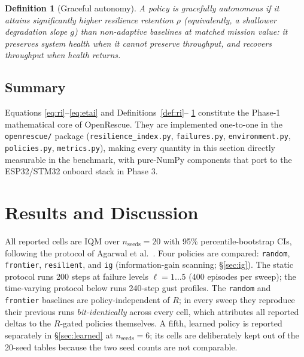 \documentclass[12pt,a4paper]{article}
\newtheorem{definition}[theorem]{Definition}
\begin{document}
\begin{definition}[Graceful autonomy]
\label{def:graceful}
A policy is \emph{gracefully autonomous} if it attains significantly higher
resilience retention $\rho$ (equivalently, a shallower degradation slope $g$)
than non-adaptive baselines at matched mission value: it preserves system
health when it cannot preserve throughput, and recovers throughput when
health returns.
\end{definition}

\subsection{Summary}
Equations \eqref{eq:ri}--\eqref{eq:etai} and Definitions~\ref{def:ri}--
\ref{def:graceful} constitute the Phase-1 mathematical core of OpenRescue.
They are implemented one-to-one in the \texttt{openrescue/} package
(\texttt{resilience\_index.py}, \texttt{failures.py}, \texttt{environment.py},
\texttt{policies.py}, \texttt{metrics.py}), making every quantity in this
section directly measurable in the benchmark, with pure-NumPy components that
port to the ESP32/STM32 onboard stack in Phase 3.

\section{Results and Discussion}
\label{sec:results}

All reported cells are IQM over $n_{\mathrm{seeds}} = 20$ with 95\%
percentile-bootstrap CIs, following the protocol of
Agarwal et al.~\cite{Agarwal2021deep}. Four policies are compared:
\texttt{random}, \texttt{frontier}, \texttt{resilient}, and \texttt{ig}
(information-gain scanning; \S\ref{sec:ig}). The static protocol runs 200
steps at failure levels $\ell = 1 \dots 5$ (400 episodes per sweep); the
time-varying protocol below runs 240-step gust profiles. The \texttt{random}
and \texttt{frontier} baselines are policy-independent of $R$; in every sweep
they reproduce their previous runs \emph{bit-identically} across every cell,
which attributes all reported deltas to the $R$-gated policies themselves. A fifth, learned policy is reported separately in \S\ref{sec:learned} at $n_{\mathrm{seeds}} = 6$; its cells are deliberately kept out of the 20-seed tables because the two seed counts are not comparable.
\end{document}
